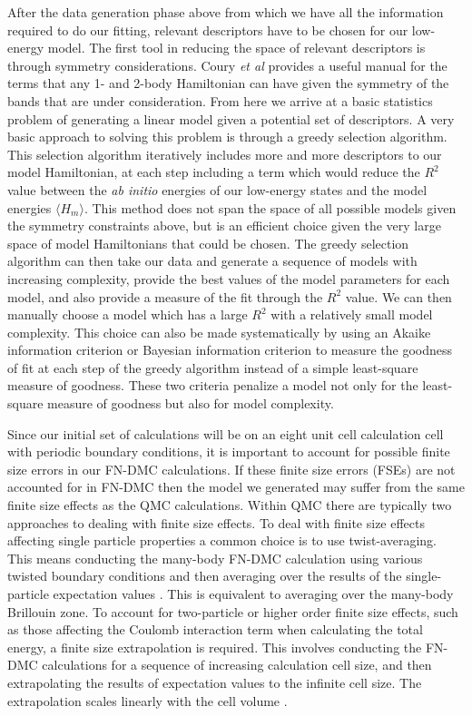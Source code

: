 \documentclass{article}
\begin{document}
After the data generation phase above from which we have all the information required to do our fitting, relevant descriptors have to be chosen for our low-energy model. 
The first tool in reducing the space of relevant descriptors is through symmetry considerations. Coury \textit{et al} \cite{Coury2016} provides a useful manual for the terms that any 1- and 2-body Hamiltonian can have given the symmetry of the bands that are under consideration. 
From here we arrive at a basic statistics problem of generating a linear model given a potential set of descriptors. 
A very basic approach to solving this problem is through a greedy selection algorithm. 
This selection algorithm iteratively includes more and more descriptors to our model Hamiltonian, at each step including a term which would reduce the $R^2$ value between the \textit{ab initio} energies of our low-energy states and the model energies $\langle H_m \rangle$. 
This method does not span the space of all possible models given the symmetry constraints above, but is an efficient choice given the very large space of model Hamiltonians that could be chosen. 
The greedy selection algorithm can then take our data and generate a sequence of models with increasing complexity, provide the best values of the model parameters for each model, and also provide a measure of the fit through the $R^2$ value. 
We can then manually choose a model which has a large $R^2$ with a relatively small model complexity. 
This choice can also be made systematically by using an Akaike information criterion \cite{ref591} or Bayesian information criterion \cite{schwarz1978} to measure the goodness of fit at each step of the greedy algorithm instead of a simple least-square measure of goodness. 
These two criteria penalize a model not only for the least-square measure of goodness but also for model complexity.

Since our initial set of calculations will be on an eight unit cell calculation cell with periodic boundary conditions, it is important to account for possible finite size errors in our FN-DMC calculations. 
If these finite size errors (FSEs) are not accounted for in FN-DMC then the model we generated may suffer from the same finite size effects as the QMC calculations. 
Within QMC there are typically two approaches to dealing with finite size effects. 
To deal with finite size effects affecting single particle properties a common choice is to use twist-averaging. 
This means conducting the many-body FN-DMC calculation using various twisted boundary conditions and then averaging over the results of the single-particle expectation values \cite{Lin2001, PhysRevB.78.125106}.
This is equivalent to averaging over the many-body Brillouin zone. 
To account for two-particle or higher order finite size effects, such as those affecting the Coulomb interaction term when calculating the total energy, a finite size extrapolation is required. 
This involves conducting the FN-DMC calculations for a sequence of increasing calculation cell size, and then extrapolating the results of expectation values to the infinite cell size. 
The extrapolation scales linearly with the cell volume \cite{PhysRevB.78.125106}.
\end{document}

